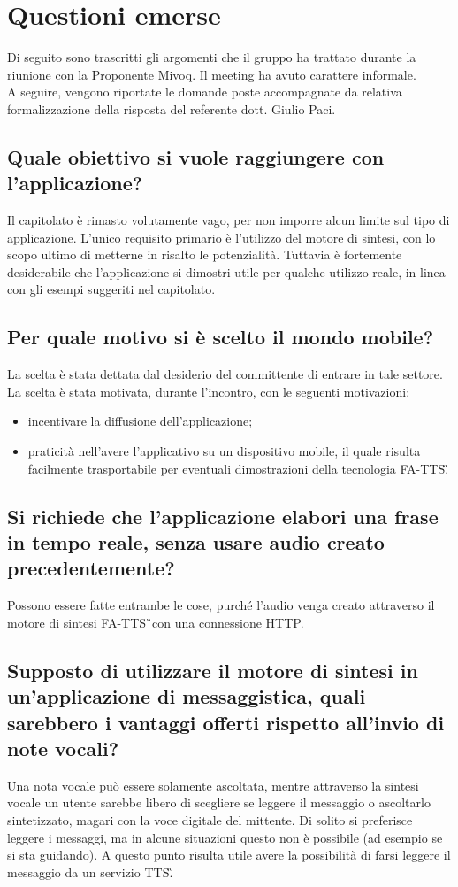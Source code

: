 \section{Questioni emerse}
Di seguito sono trascritti gli argomenti che il gruppo ha trattato durante la 
riunione con la Proponente Mivoq. Il meeting ha avuto carattere informale. \\ A 
seguire, vengono riportate le domande poste accompagnate da relativa 
formalizzazione della risposta del referente dott. Giulio Paci.

\subsection{Quale obiettivo si vuole raggiungere con l’applicazione?}
Il capitolato è rimasto volutamente vago, per non imporre alcun limite sul tipo 
di applicazione. L'unico requisito primario è l'utilizzo del motore di sintesi, 
con lo scopo ultimo di metterne in risalto le potenzialità. Tuttavia è 
fortemente desiderabile che l'applicazione si dimostri utile per qualche 
utilizzo reale, in linea con gli esempi suggeriti nel capitolato.


\subsection{Per quale motivo si è scelto il mondo mobile?}
La scelta è stata dettata dal desiderio del committente di entrare in tale 
settore. La scelta è stata motivata, durante l'incontro, con le seguenti 
motivazioni:
\begin{itemize}
\item incentivare la diffusione dell'applicazione;
\item praticità nell'avere l'applicativo su un dispositivo mobile, il quale 
risulta facilmente trasportabile per eventuali dimostrazioni della tecnologia 
FA-TTS\G.
\end{itemize}


\subsection{Si richiede che l'applicazione elabori una frase in tempo reale, 
senza usare audio creato precedentemente?}
Possono essere fatte entrambe le cose, purché l'audio venga creato attraverso 
il motore di sintesi FA-TTS\G\ con una connessione HTTP.


\subsection{Supposto di utilizzare il motore di sintesi in un’applicazione di messaggistica, quali sarebbero i vantaggi offerti rispetto all’invio di note vocali?}
Una nota vocale può essere solamente ascoltata, mentre attraverso la sintesi 
vocale un utente sarebbe libero di scegliere se leggere il messaggio o 
ascoltarlo sintetizzato, magari con la voce digitale del mittente. Di solito si 
preferisce leggere i messaggi, ma in alcune situazioni  questo non è possibile 
(ad esempio se si sta guidando). A questo punto risulta utile avere la 
possibilità di farsi leggere il messaggio da un servizio TTS\G.

